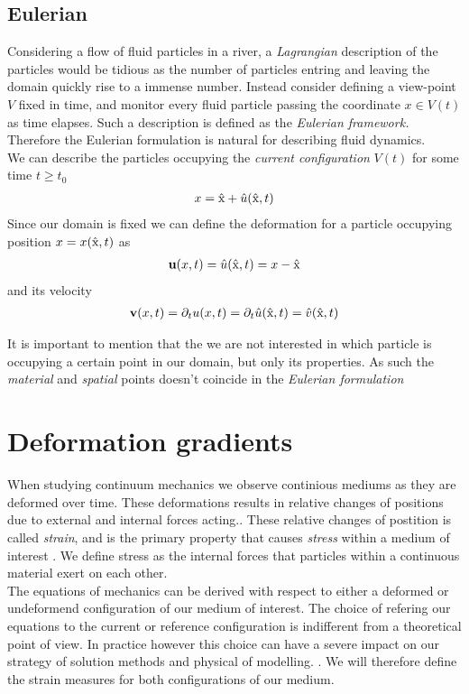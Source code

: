 \subsection{Eulerian}
Considering a flow of fluid particles in a river, a \textit{Lagrangian} description of the particles would be tidious as the number of particles entring and leaving the domain quickly rise to a immense number. 
Instead consider defining a view-point $V$ fixed in time, and monitor every fluid particle passing the coordinate $x \in V(t)$ as time elapses. Such a description is defined as the \textit{Eulerian framework.} 
Therefore the Eulerian formulation is natural for describing fluid dynamics. \\
We can describe the particles occupying the \textit{current configuration} $V(t)$ for some time $t \geq t_0$ 
\begin{align*}
x = \text{\^{x}} + \hat{u}(\text{\^{x}}, t)	
\end{align*}
Since our domain is fixed we can define the deformation for a particle 
occupying position $x = x(\text{\^{x}},t)$ as
\begin{align*}
\textbf{u}(x, t) = \hat{u}(\text{\^{x}}, t) = x - \text{\^{x}}	\\
\end{align*}
and its velocity
\begin{align*}
\textbf{v}(x,t) = \partial_t u(x,t) = \partial_t \hat{u}(\text{\^{x}},t) = \hat{v}(\text{\^{x}},t)
\end{align*}

It is important to mention that the we are not interested in which particle is occupying a certain point in our domain, but only its properties. As such the \textit{material} and \textit{spatial} points doesn't coincide in the \textit{Eulerian formulation}


\section{Deformation gradients}
When studying continuum mechanics we observe continious mediums as they are deformed over time. These deformations
results in relative changes of positions due to external and internal forces acting.. These relative changes of postition is called
\textit{strain}, and is the primary property that causes \textit{stress} within a medium of interest \cite{Richter2016}. We define stress as the internal forces that particles within a continuous material exert on each other. \\

The equations of mechanics can be derived with respect to either a deformed or undeformend configuration of our medium of interest. The choice of refering our equations to the current or reference configuration is indifferent from a theoretical point of view. In practice however this choice can have a severe impact on our strategy of solution methods and physical of modelling.   \cite{Wriggers2006}. We will therefore define the strain measures for both configurations of our medium.  

